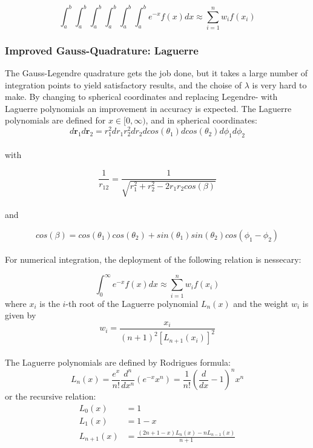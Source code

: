 \documentclass[../main.tex]{subfiles}
\begin{document}
\[\int_a^b\int_a^b\int_a^b\int_a^b\int_a^b\int_a^b e^{-x}f(x)dx \approx \sum_{i=1}^n w_i f(x_i)\]

\subsubsection{Improved Gauss-Quadrature: Laguerre} \label{sec:improved_GQ}
The Gauss-Legendre quadrature gets the job done, but it takes a large number of integration points to yield satisfactory results, and the choise of $\lambda$ is very hard to make. By changing to spherical coordinates and replacing Legendre- with Laguerre polynomials an improvement in accuracy is expected. The Laguerre polynomials are defined for  $x \in [0, \infty)$, and in spherical coordinates:
\\

\begin{equation}
  d\mathbf{r}_1 d\mathbf{r}_2 = r_1^2 dr_1 r_2^2 dr_2 dcos(\theta_1) dcos(\theta_2) d\phi_1 d\phi_2
  \label{eq:sphere-cord1}
\end{equation}
\\
with

\begin{equation}
  \frac{1}{r_{12}} = \frac{1}{\sqrt{r_1^2 + r_2^2 - 2r_1r_2cos(\beta)}}
  \label{eq:sphere-cord2}
\end{equation}
\\and

\begin{equation}
  cos(\beta) = cos(\theta_1)cos(\theta_2) + sin(\theta_1)sin(\theta_2)cos(\phi_1 - \phi_2)
  \label{eq:sphere-cord3}
\end{equation}
\\

For numerical integration, the deployment of the following relation is nessecary:

\[\int_0^\infty e^{-x}f(x)dx \approx \sum_{i=1}^n w_i f(x_i)\]
where $x_i$ is the $i$-th root of the Laguerre polynomial $L_n(x)$ and the weight $w_i$ is given by
\\
\[w_i = \frac{x_i}{(n+1)^2 [L_{n+1}(x_i)]^2}\]
\\
The Laguerre polynomials are defined by Rodrigues formula:
\[L_n(x) = \frac{e^x}{n!}\frac{d^n}{dx^n}\left(e^{-x} x^n\right) = \frac{1}{n!}\left(\frac{d}{dx}-1\right)^n x^n\]
or the recursive relation:
\begin{align*}
  L_0(x) &= 1\\
  L_1(x) &= 1 - x\\
  L_{n+1}(x) &= \frac{(2n + 1 - x)L_n(x) - nL_{n-1}(x)}{n+1}\\
\end{align*}
\end{document}
